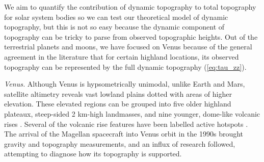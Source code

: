 We aim to quantify the contribution of dynamic topography to total topography for solar system bodies so we can test our theoretical model of dynamic topography, but this is not so easy because the dynamic component of topography can be tricky to parse from observed topographic heights. Out of the terrestrial planets and moons, we have focused on Venus because of the general agreement in the literature that for certain highland locations, its observed topography can be represented by the full dynamic topography (\ref{eq:tau_zz}). 



\vspace{0.5cm}

\textit{\color{teal1} Venus.} Although Venus is hypsometrically unimodal, unlike Earth and Mars, satellite altimetry reveals vast lowland plains dotted with areas of higher elevation. These elevated regions can be grouped into five older highland plateaux, steep-sided 2 km-high landmasses, and nine younger, dome-like volcanic rises \citep{Phillips1998}. Several of the volcanic rise features have been labelled active hotspots \citep{Kiefer1991, Smrekar1991, Grimm1992, Smrekar1994, Stofan1995, Smrekar2010}. The arrival of the Magellan spacecraft into Venus orbit in the 1990s brought gravity and topography measurements, and an influx of research followed, attempting to diagnose how its topography is supported. 


